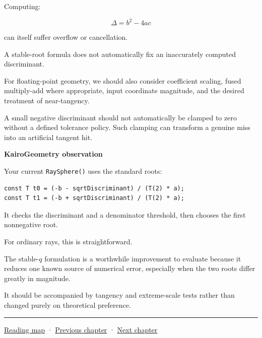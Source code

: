 Computing:

\[
\Delta=b^2-4ac
\]

can itself suffer overflow or cancellation.

A stable-root formula does not automatically fix an inaccurately computed discriminant.

For floating-point geometry, we should also consider coefficient scaling, fused multiply-add where appropriate, input coordinate magnitude, and the desired treatment of near-tangency.

A small negative discriminant should not automatically be clamped to zero without a defined tolerance policy. Such clamping can transform a genuine miss into an artificial tangent hit.

\textbf{KairoGeometry observation}

Your current \texttt{RaySphere()} uses the standard roots:

\begin{verbatim}
const T t0 = (-b - sqrtDiscriminant) / (T(2) * a);
const T t1 = (-b + sqrtDiscriminant) / (T(2) * a);
\end{verbatim}

It checks the discriminant and a denominator threshold, then chooses the first nonnegative root.

For ordinary rays, this is straightforward.

The stable-\(q\) formulation is a worthwhile improvement to evaluate because it reduces one known source of numerical error, especially when the two roots differ greatly in magnitude.

It should be accompanied by tangency and extreme-scale tests rather than changed purely on theoretical preference.

\begin{center}\rule{0.5\linewidth}{0.5pt}\end{center}

\hyperref[volume-reading-map]{Reading map} · \hyperref[04-visual-computing-ii-ch022]{Previous chapter} · \hyperref[04-visual-computing-ii-ch024]{Next chapter}
